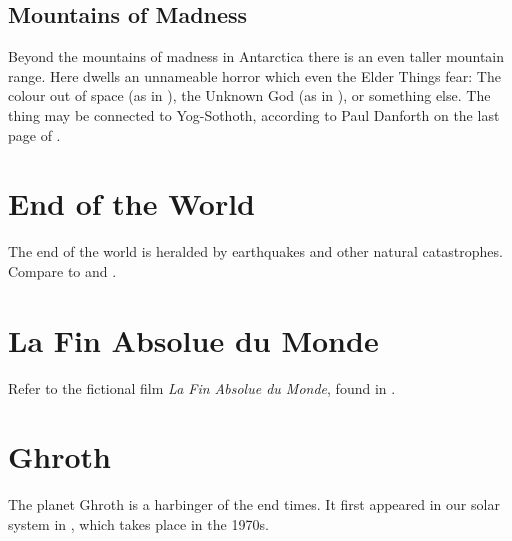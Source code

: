 \documentclass[a4paper,12pt,openany,oneside]{book}
\begin{document}
\subsection{Mountains of Madness}
Beyond the mountains of madness in Antarctica there is an even taller mountain range. 
Here dwells an unnameable horror which even the Elder Things fear:
The colour out of space (as in \cite{TimCurran:Hive}), the Unknown God (as in \cite{RPG:CallofCthulhu:BeyondtheMountainsofMadness}), or something else. 
The thing may be connected to Yog-Sothoth, according to Paul Danforth on the last page of \cite{HPLovecraft:AttheMountainsofMadness}. 















\section{End of the World}
The end of the world is heralded by earthquakes and other natural catastrophes. 
Compare to \cite{RPG:CallofCthulhu:EndTime} and \cite{RobertBloch:StrangeEons}. 















\section{La Fin Absolue du Monde}
Refer to the fictional film \emph{La Fin Absolue du Monde}, found in \cite{Movie:CigaretteBurns}.















\section{Ghroth}
The planet Ghroth is a harbinger of the end times. 
It first appeared in our solar system in \cite{RamseyCampbell:TheTugging}, which takes place in the 1970s. 
 
\end{document}
